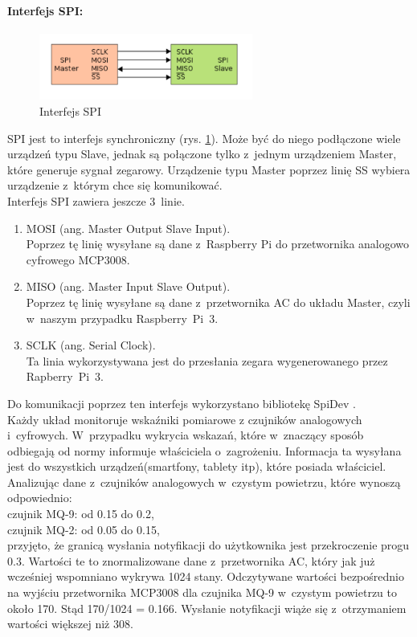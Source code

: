 \paragraph{Interfejs SPI:}
\begin{figure}[ht]
	\centering
	\includegraphics[width=7cm]{SPI.png}
	\caption{Interfejs SPI \protect\cite{spi}}
	\label{spi}
\end{figure}
SPI jest to interfejs synchroniczny (rys. \ref{spi}). Może być do niego podłączone wiele urządzeń typu Slave, jednak są połączone tylko z~jednym urządzeniem Master, które generuje sygnał zegarowy. Urządzenie typu Master poprzez linię SS wybiera urządzenie z~którym chce się komunikować. \\
Interfejs SPI zawiera jeszcze 3~linie.
\begin{enumerate} 
\item MOSI (ang. Master Output Slave Input). \\
Poprzez tę linię wysyłane są dane z~Raspberry Pi do przetwornika analogowo cyfrowego MCP3008.
\item MISO (ang. Master Input Slave Output).\\
Poprzez tę linię wysyłane są dane z~przetwornika AC do układu Master, czyli w~naszym przypadku Raspberry~Pi~3.
\item SCLK (ang. Serial Clock).\\
Ta linia wykorzystywana jest do przesłania zegara wygenerowanego przez Rapberry~Pi~3.
\end{enumerate}
Do komunikacji poprzez ten interfejs wykorzystano bibliotekę SpiDev \cite{spidev}. \\
Każdy układ monitoruje wskaźniki pomiarowe z czujników analogowych i~cyfrowych. W~przypadku wykrycia wskazań, które w~znaczący sposób odbiegają od normy informuje właściciela o~zagrożeniu. Informacja ta wysyłana jest do wszystkich urządzeń(smartfony, tablety itp), które posiada właściciel.  Analizując dane z~czujników analogowych w~czystym powietrzu, które wynoszą odpowiednio:\\
czujnik MQ-9: od 0.15 do 0.2,\\
czujnik MQ-2: od 0.05 do 0.15,\\
przyjęto, że granicą wysłania notyfikacji do użytkownika jest przekroczenie progu 0.3. Wartości te to znormalizowane dane z~przetwornika AC, który jak już wcześniej wspomniano wykrywa 1024 stany. Odczytywane wartości bezpośrednio na wyjściu przetwornika MCP3008 dla czujnika MQ-9 w~czystym powietrzu to około 170. Stąd 170/1024 = 0.166. Wysłanie notyfikacji wiąże się z~otrzymaniem wartości większej niż 308.

